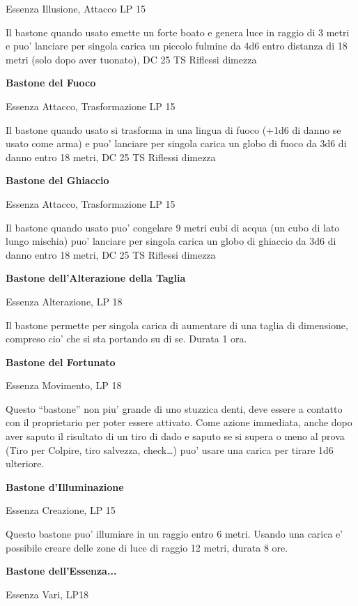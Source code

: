 \documentclass[a4paper,11pt,twoside,openany]{dndbook}
\begin{document}
Essenza Illusione, Attacco LP 15

Il bastone quando usato emette un forte boato e genera luce in raggio di 3 metri e puo' lanciare per singola carica un piccolo fulmine da 4d6 entro distanza di 18 metri (solo dopo aver tuonato), DC 25 TS Riflessi dimezza

\textbf{Bastone del Fuoco}

Essenza Attacco, Trasformazione LP 15

Il bastone quando usato si trasforma in una lingua di fuoco (+1d6 di danno se usato come arma) e puo' lanciare per singola carica un globo di fuoco da 3d6 di danno entro 18 metri, DC 25 TS Riflessi dimezza

\textbf{Bastone del Ghiaccio}

Essenza Attacco, Trasformazione LP 15

Il bastone quando usato puo' congelare 9 metri cubi di acqua (un cubo di lato lungo mischia) puo' lanciare per singola carica un globo di ghiaccio da 3d6 di danno entro 18 metri, DC 25 TS Riflessi dimezza 

\textbf{Bastone dell'Alterazione della Taglia}

Essenza Alterazione, LP 18

Il bastone permette per singola carica di aumentare di una taglia di dimensione, compreso cio' che si sta portando su di se. Durata 1 ora.

\textbf{Bastone del Fortunato}

Essenza Movimento, LP 18

Questo ``bastone'' non piu' grande di uno stuzzica denti, deve essere a contatto con il proprietario per poter essere attivato. Come azione immediata, anche dopo aver saputo il risultato di un tiro di dado e saputo se si supera o meno al prova (Tiro per Colpire, tiro salvezza, check\ldots ) puo' usare una carica per tirare 1d6 ulteriore.

\textbf{Bastone d'Illuminazione}

Essenza Creazione, LP 15

Questo bastone puo' illumiare in un raggio entro 6 metri. Usando una carica e' possibile creare delle zone di luce di raggio 12 metri, durata 8 ore.

\textbf{Bastone dell'Essenza...}

Essenza Vari, LP18
\end{document}
